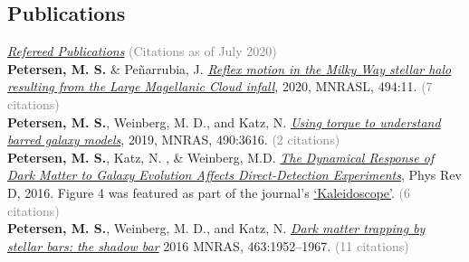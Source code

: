 \documentclass[margin, 11pt]{res} %
\begin{document}
\begin{resume}
\section{\sc \textcolor{redshade}{Publications} }
 \underline{\sl Refereed Publications} \textcolor{grey}{(Citations as of July 2020)} \\
{\bf \textcolor{blueshade}{Petersen, M. S.}} \& Pe{\~n}arrubia, J. \href{https://ui.adsabs.harvard.edu/abs/2020MNRAS.494L..11P/abstract}{\it Reflex motion in the Milky Way stellar halo resulting from the Large Magellanic Cloud infall}, 2020, MNRASL, 494:11. \textcolor{grey}{(7 citations)}\\ %
{\bf \textcolor{blueshade}{Petersen, M. S.}}, Weinberg, M. D., and Katz, N. \href{https://ui.adsabs.harvard.edu/abs/2019MNRAS.490.3616P/abstract}{\it Using torque to understand barred galaxy models}, 2019, MNRAS, 490:3616. \textcolor{grey}{(2 citations)}\\
{\bf \textcolor{blueshade}{Petersen, M. S.}}, Katz, N. , \& Weinberg, M.D. \href{http://adsabs.harvard.edu/abs/2016PhRvD..94l3013P}{{\it The Dynamical Response of Dark Matter to Galaxy Evolution Affects Direct-Detection Experiments}}, Phys Rev D, 2016. Figure 4 was featured as part of the journal's \href{https://journals.aps.org/prd/kaleidoscope/prd/94/12/123013}{`Kaleidoscope'}. \textcolor{grey}{(6 citations)}\\
{\bf \textcolor{blueshade}{Petersen, M. S.}}, Weinberg, M. D., and Katz, N. \href{http://adsabs.harvard.edu/abs/2016MNRAS.463.1952P}{{\it  Dark matter trapping by stellar bars: the shadow bar}} 2016 MNRAS, 463:1952–1967. \textcolor{grey}{(11 citations)}\\


\end{resume}
\end{document}
